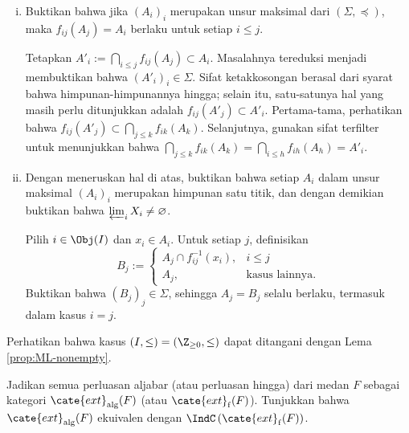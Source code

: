 \begin{Exercises}
\begin{enumerate}[(i)]
		\begin{hint}
			Mudah dilihat bahwa $\Sigma$ tidak kosong. Untuk suatu rantai dalam $(\Sigma, \preceq)$, perlu diperiksa bahwa mengambil irisan pada setiap indeks $i$ tetap memberikan suatu unsur dari $\Sigma$, dan dengan demikian memberikan batas atas bagi rantai tersebut. Sifat ketakkosongan memerlukan syarat bahwa himpunan-himpunannya hingga.
		\end{hint}
		
		\item Buktikan bahwa jika $(A_i)_i$ merupakan unsur maksimal dari $(\Sigma, \preceq)$, maka $f_{ij}(A_j) = A_i$ berlaku untuk setiap $i \leq j$.
		
		\begin{hint}
			Tetapkan $A'_i := \bigcap_{i \leq j} f_{ij}(A_j) \subset A_i$. Masalahnya tereduksi menjadi membuktikan bahwa $(A'_i)_i \in \Sigma$. Sifat ketakkosongan berasal dari syarat bahwa himpunan-himpunannya hingga; selain itu, satu-satunya hal yang masih perlu ditunjukkan adalah $f_{ij}(A'_j) \subset A'_i$. Pertama-tama, perhatikan bahwa $f_{ij}(A'_j) \subset \bigcap_{j \leq k} f_{ik}(A_k)$. Selanjutnya, gunakan sifat terfilter untuk menunjukkan bahwa $\bigcap_{j \leq k} f_{ik}(A_k) = \bigcap_{i \leq h} f_{ih}(A_h) = A'_i$.
		\end{hint}
		
		\item Dengan meneruskan hal di atas, buktikan bahwa setiap $A_i$ dalam unsur maksimal $(A_i)_i$ merupakan himpunan satu titik, dan dengan demikian buktikan bahwa $\varprojlim_i X_i \neq \emptyset$.
		
		\begin{hint}
			Pilih $i \in \Obj(I)$ dan $x_i \in A_i$. Untuk setiap $j$, definisikan
			\[ B_j := \begin{cases}
				A_j \cap f_{ij}^{-1}(x_i), & i \leq j \\
				A_j, & \text{kasus lainnya}.
			\end{cases} \]
			Buktikan bahwa $(B_j)_j \in \Sigma$, sehingga $A_j = B_j$ selalu berlaku, termasuk dalam kasus $i=j$.
		\end{hint}
	\end{enumerate}
	Perhatikan bahwa kasus $(I, \leq) = (\Z_{\geq 0}, \leq)$ dapat ditangani dengan Lema \ref{prop:ML-nonempty}.
	
	\item Jadikan semua perluasan aljabar (atau perluasan hingga) dari medan $F$ sebagai kategori $\cate{ext}_{\mathrm{alg}}(F)$ (atau $\cate{ext}_{\mathrm{f}}(F)$). Tunjukkan bahwa $\cate{ext}_{\mathrm{alg}}(F)$ ekuivalen dengan $\IndC\left(\cate{ext}_{\mathrm{f}}(F)\right)$.
	

\end{Exercises}
